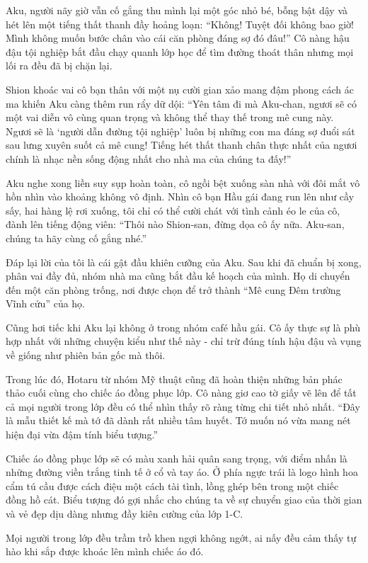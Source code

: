 \documentclass[../main.tex]{subfiles}
\begin{document}
Aku, người nãy giờ vẫn cố gắng thu mình lại một góc nhỏ bé, bỗng bật dậy và hét lên một tiếng thất thanh đầy hoảng loạn: ``Không! Tuyệt đối không bao giờ! Mình không muốn bước chân vào cái căn phòng đáng sợ đó đâu!'' Cô nàng hậu đậu tội nghiệp bắt đầu chạy quanh lớp học để tìm đường thoát thân nhưng mọi lối ra đều đã bị chặn lại.

Shion khoác vai cô bạn thân với một nụ cười gian xảo mang đậm phong cách ác ma khiến Aku càng thêm run rẩy dữ dội: ``Yên tâm đi mà Aku-chan, ngươi sẽ có một vai diễn vô cùng quan trọng và không thể thay thế trong mê cung này. Ngươi sẽ là `người dẫn đường tội nghiệp' luôn bị những con ma đáng sợ đuổi sát sau lưng xuyên suốt cả mê cung! Tiếng hét thất thanh chân thực nhất của ngươi chính là nhạc nền sống động nhất cho nhà ma của chúng ta đấy!''

Aku nghe xong liền suy sụp hoàn toàn, cô ngồi bệt xuống sàn nhà với đôi mắt vô hồn nhìn vào khoảng không vô định. Nhìn cô bạn Hầu gái đang run lên như cầy sấy, hai hàng lệ rơi xuống, tôi chỉ có thể cười chát với tình cảnh éo le của cô, đành lên tiếng động viên: ``Thôi nào Shion-san, đừng dọa cô ấy nữa. Aku-san, chúng ta hãy cùng cố gắng nhé.''

Đáp lại lời của tôi là cái gật đầu khiên cưỡng của Aku. Sau khi đã chuẩn bị xong, phân vai đầy đủ, nhóm nhà ma cũng bắt đầu kế hoạch của mình. Họ di chuyển đến một căn phòng trống, nơi được chọn để trở thành ``Mê cung Đêm trường Vĩnh cửu'' của họ.

Cũng hơi tiếc khi Aku lại không ở trong nhóm café hầu gái. Cô ấy thực sự là phù hợp nhất với những chuyện kiểu như thế này - chỉ trừ đúng tính hậu đậu và vụng về giống như phiên bản gốc mà thôi.

Trong lúc đó, Hotaru từ nhóm Mỹ thuật cũng đã hoàn thiện những bản phác thảo cuối cùng cho chiếc áo đồng phục lớp. Cô nàng giơ cao tờ giấy vẽ lên để tất cả mọi người trong lớp đều có thể nhìn thấy rõ ràng từng chi tiết nhỏ nhất. ``Đây là mẫu thiết kế mà tớ đã dành rất nhiều tâm huyết. Tớ muốn nó vừa mang nét hiện đại vừa đậm tính biểu tượng.''

Chiếc áo đồng phục lớp sẽ có màu xanh hải quân sang trọng, với điểm nhấn là những đường viền trắng tinh tế ở cổ và tay áo. Ở phía ngực trái là logo hình hoa cẩm tú cầu được cách điệu một cách tài tình, lồng ghép bên trong một chiếc đồng hồ cát. Biểu tượng đó gợi nhắc cho chúng ta về sự chuyển giao của thời gian và vẻ đẹp dịu dàng nhưng đầy kiên cường của lớp 1-C.

Mọi người trong lớp đều trầm trồ khen ngợi không ngớt, ai nấy đều cảm thấy tự hào khi sắp được khoác lên mình chiếc áo đó.
\end{document}
